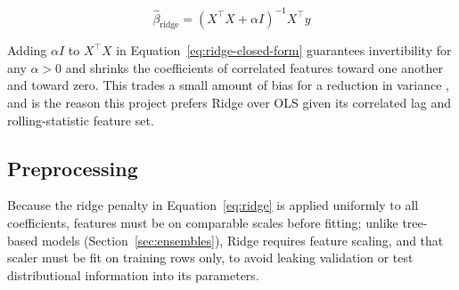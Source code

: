 \begin{equation}
\label{eq:ridge-closed-form}
\hat\beta_{\mathrm{ridge}} = \left(X^\top X + \alpha I\right)^{-1} X^\top y
\end{equation}

Adding $\alpha I$ to $X^\top X$ in Equation~\ref{eq:ridge-closed-form}
guarantees invertibility for any $\alpha>0$ and shrinks the coefficients of
correlated features toward one another and toward zero. This trades a
small amount of bias for a reduction in variance \cite{hoerl1970ridge},
and is the reason this project prefers Ridge over OLS given its
correlated lag and rolling-statistic feature set.

\subsection{Preprocessing}

Because the ridge penalty in Equation~\ref{eq:ridge} is applied uniformly
to all coefficients, features must be on comparable scales before
fitting; unlike tree-based models (Section~\ref{sec:ensembles}), Ridge
requires feature scaling, and that scaler must be fit on training rows
only, to avoid leaking validation or test distributional information into
its parameters.
